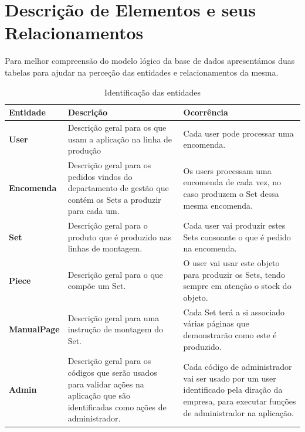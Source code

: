     \newpage
    \section{Descrição de Elementos e seus Relacionamentos}
    Para melhor compreensão do modelo lógico da base de dados apresentámos duas tabelas para ajudar na perceção das entidades e relacionamentos da mesma.
    \begin{table}[h!]
    \centering
    \renewcommand{\arraystretch}{1.5} %
    \begin{tabular}{|m{3cm}|m{6cm}|m{6cm}|}
        \hline
        \rowcolor{gray!28} %
        \textbf{Entidade} & \textbf{Descrição} & \textbf{Ocorrência} \\ \hline
        \textbf{User} & Descrição geral para os que usam a aplicação na linha de produção & Cada user pode processar uma encomenda. \\ \hline
        \textbf{Encomenda} & Descrição geral para os pedidos vindos do departamento de gestão que contém os Sets a produzir para cada um. & Os users processam uma encomenda de cada vez, no caso produzem o Set dessa mesma encomenda. \\ \hline
        \textbf{Set} & Descrição geral para o produto que é produzido nas linhas de montagem. & Cada user vai produzir estes Sets consoante o que é pedido na encomenda. \\ \hline
        \textbf{Piece} & Descrição geral para o que compõe um Set. & O user vai usar este objeto para produzir os Sets, tendo sempre em atenção o stock do objeto. \\ \hline
        \textbf{ManualPage} & Descrição geral para uma instrução de montagem do Set. & Cada Set terá a si associado várias páginas que demonstrarão como este é produzido. \\ \hline
        \textbf{Admin} & Descrição geral para os códigos que serão usados para validar ações na aplicação que são identificadas como ações de administrador. & Cada código de administrador vai ser usado por um user identificado pela diração da empresa, para executar funções de administrador na aplicação. \\ \hline
    \end{tabular}
    \caption{Identificação das entidades}
    \label{tab:identificacao_entidades}
\end{table}
\newpage

